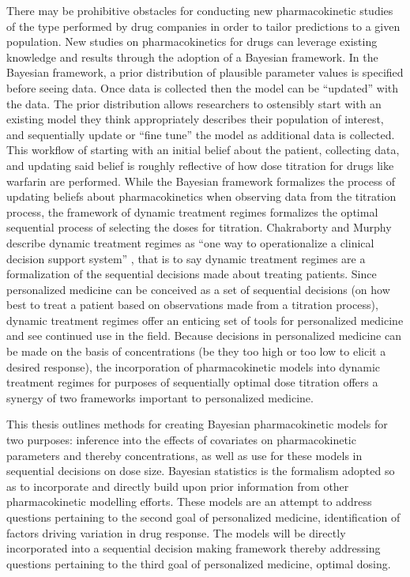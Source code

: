 There may be prohibitive obstacles for conducting new pharmacokinetic studies of the type performed by drug companies in order to tailor predictions to a given population. New studies on pharmacokinetics for drugs can leverage existing knowledge and results through the adoption of a Bayesian framework.  In the Bayesian framework, a prior distribution of plausible parameter values is specified before seeing data.  Once data is collected then the model can be ``updated'' with the data.  The prior distribution allows researchers to ostensibly start with an existing model they think appropriately describes their population of interest, and sequentially update or ``fine tune'' the model as additional data is collected. This workflow of starting with an initial belief about the patient, collecting data, and updating said belief is roughly reflective of how dose titration for drugs like warfarin are performed.   While the Bayesian framework formalizes the process of updating beliefs about pharmacokinetics when observing data from the titration process, the framework of dynamic treatment regimes formalizes the optimal sequential process of selecting the doses for titration.  Chakraborty and Murphy describe dynamic treatment regimes as ``one way to operationalize a clinical decision support system'' \cite{chakraborty_dynamic_2014}, that is to say dynamic treatment regimes are a formalization of the sequential decisions made about treating patients.  Since personalized medicine can be conceived as a set of sequential decisions (on how best to treat a patient based on observations made from a titration process), dynamic treatment regimes offer an enticing set of tools for personalized medicine and see continued use in the field.  Because decisions in personalized medicine can be made on the basis of concentrations (be they too high or too low to elicit a desired response), the incorporation of pharmacokinetic models into dynamic treatment regimes for purposes of sequentially optimal dose titration offers a synergy of two frameworks important to personalized medicine.

This thesis outlines methods for creating Bayesian pharmacokinetic models for two purposes: inference into the effects of covariates on pharmacokinetic parameters and thereby concentrations, as well as use for these models in sequential decisions on dose size.    Bayesian statistics is the formalism adopted so as to incorporate and directly build upon prior information from other pharmacokinetic modelling efforts.  These models are an attempt to address questions pertaining to the second goal of personalized medicine, identification of factors driving variation in drug response.  The models will be directly incorporated into a sequential decision making framework thereby addressing questions pertaining to the third goal of personalized medicine, optimal dosing.


